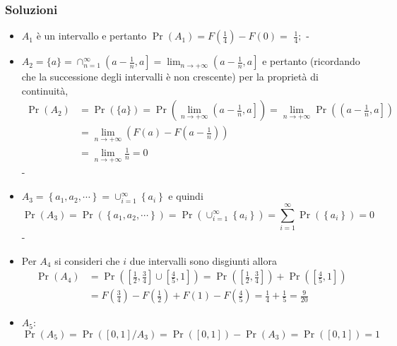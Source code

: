 	\subsubsection*{Soluzioni}
	\begin{itemize}
			\item $A_1$ è un intervallo e pertanto $\Pr\left(A_1\right)=F\left(\frac{1}{4}\right)-F(0)=$ $\frac{1}{4} ;$
			      - \item$A_2=\{a\}=\cap_{n=1}^{\infty}\left(a-\frac{1}{n}, a\right]=\lim _{n \rightarrow+\infty}\left(a-\frac{1}{n}, a\right]$ e pertanto (ricordando che la successione degli intervalli è non crescente) per la proprietà di continuità,
			      \[
				      \begin{aligned}
					      \Pr\left(A_2\right) & =\Pr(\{a\})=\Pr\left(\lim _{n \rightarrow+\infty}\left(a-\frac{1}{n}, a\right]\right)=\lim _{n \rightarrow+\infty} \Pr\left(\left(a-\frac{1}{n}, a\right]\right) \\
					                          & =\lim _{n \rightarrow+\infty}\left(F(a)-F\left(a-\frac{1}{n}\right)\right)                                                                                       \\
					                          & =\lim _{n \rightarrow+\infty} \frac{1}{n}=0
				      \end{aligned}
			      \]
			      -\item $A_3=\left\{a_1, a_2, \cdots\right\}=\cup_{i=1}^{\infty}\left\{a_i\right\}$ e quindi
			      \[
				      \Pr\left(A_3\right)=\Pr\left(\left\{a_1, a_2, \cdots\right\}\right)=\Pr\left(\cup_{i=1}^{\infty}\left\{a_i\right\}\right)=\sum_{i=1}^{\infty} \Pr\left(\left\{a_i\right\}\right)=0
			      \]
			      -\item Per $A_4$ si consideri che $i$ due intervalli sono disgiunti allora
			      \[
				      \begin{aligned}
					      \Pr\left(A_4\right) & =\Pr\left(\left[\frac{1}{2}, \frac{3}{4}\right] \cup\left[\frac{4}{5}, 1\right]\right)=\Pr\left(\left[\frac{1}{2}, \frac{3}{4}\right]\right)+\Pr\left(\left[\frac{4}{5}, 1\right]\right) \\[0.7em]
					                          & =F\left(\frac{3}{4}\right)-F\left(\frac{1}{2}\right)+F(1)-F\left(\frac{4}{5}\right)=\frac{1}{4}+\frac{1}{5}=\frac{9}{20}
				      \end{aligned}
			      \]
			\item $ A_5 $:
			      \[
				      \Pr\left(A_5\right)=\Pr\left([0,1] / A_3\right)=\Pr([0,1])-\Pr\left(A_3\right)=\Pr([0,1])=1
\]
\end{itemize}
